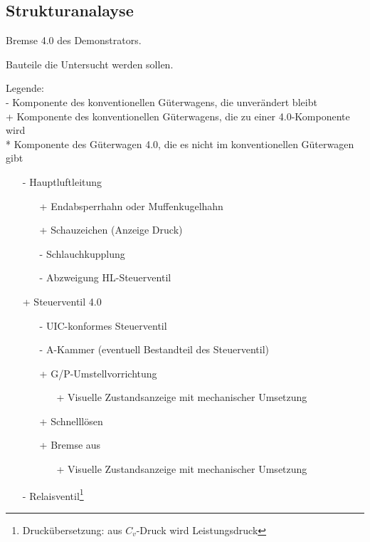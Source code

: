 \subsection{Strukturanalayse}
Bremse 4.0 des Demonstrators.\par
Bauteile die Untersucht werden sollen.\par
Legende: \\
- Komponente des konventionellen Güterwagens, die unverändert bleibt\\
+ Komponente des konventionellen Güterwagens, die zu einer 4.0-Komponente wird\\
\** Komponente des Güterwagen 4.0, die es nicht im konventionellen Güterwagen gibt\par
\begin{itemize}
    \item[-] Hauptluftleitung
    \begin{itemize}
        \item[+] Endabsperrhahn oder Muffenkugelhahn
        \item[+] Schauzeichen (Anzeige Druck)
        \item[-] Schlauchkupplung
        \item[-] Abzweigung HL-Steuerventil
    \end{itemize}
    \item[+] Steuerventil 4.0
    \begin{itemize}
        \item[-] UIC-konformes Steuerventil
        \item[-] A-Kammer (eventuell Bestandteil des Steuerventil)
        \item[+] G/P-Umstellvorrichtung
        \begin{itemize}
            \item[+] Visuelle Zustandsanzeige mit mechanischer Umsetzung
        \end{itemize}
        \item[+] Schnelllösen
        \item[+] Bremse aus
        \begin{itemize}
            \item[+] Visuelle Zustandsanzeige mit mechanischer Umsetzung
        \end{itemize}
    \end{itemize}
    \item[-] Relaisventil\footnote{Druckübersetzung: aus $C_v$-Druck wird Leistungsdruck}
    \begin{itemize}

\end{itemize}
\end{itemize}
